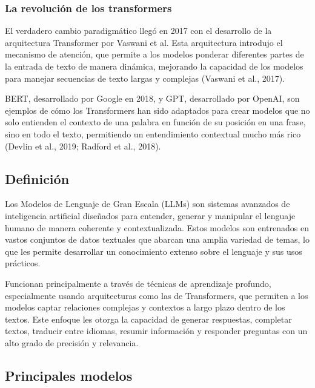 \subsubsection*{La revolución de los transformers}
El verdadero cambio paradigmático llegó en 2017 con el desarrollo de la arquitectura
Transformer por Vaswani et al. Esta arquitectura introdujo el mecanismo
de atención, que permite a los modelos ponderar diferentes partes de la entrada de texto de manera dinámica,
mejorando la capacidad de los modelos para manejar secuencias de texto largas y complejas (Vaswani et al., 2017).


BERT, desarrollado por Google en 2018, y GPT, desarrollado por OpenAI, son ejemplos de
cómo los Transformers han sido adaptados para crear modelos que
no solo entienden el contexto de una palabra en función de su posición en una frase, sino en todo
el texto, permitiendo un entendimiento contextual mucho más rico (Devlin et al., 2019; Radford et al., 2018).

\subsection{Definición}
Los Modelos de Lenguaje de Gran Escala (LLMs) son sistemas
avanzados de inteligencia artificial diseñados para entender, generar y
manipular el lenguaje humano de manera coherente y contextualizada. Estos
modelos son entrenados en vastos conjuntos de datos textuales que abarcan una amplia variedad de temas, lo que les
permite desarrollar un conocimiento extenso sobre el lenguaje y sus usos prácticos.

Funcionan principalmente a través de técnicas de aprendizaje
profundo, especialmente usando arquitecturas como las de Transformers,
que permiten a los modelos captar relaciones complejas y contextos a largo plazo dentro de los textos. Este enfoque les
otorga la capacidad de generar respuestas, completar textos,
traducir entre idiomas, resumir información y responder preguntas con un alto grado de precisión y relevancia.

\subsection{Principales modelos}

